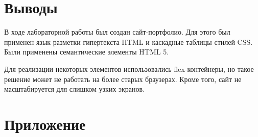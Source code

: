 \documentclass[a4paper,14pt]{extarticle}
\begin{document}
\section*{Выводы}
В ходе лабораторной работы был создан сайт-портфолио. Для этого
был применен язык разметки гипертекста HTML и каскадные таблицы
стилей CSS. Были применены семантические элементы HTML 5.

Для реализации некоторых элементов использовались flex-контейнеры,
но такое решение может не работать на более старых браузерах.
Кроме того, сайт не масштабируется для слишком узких экранов.
\section*{Приложение}

\end{document}
